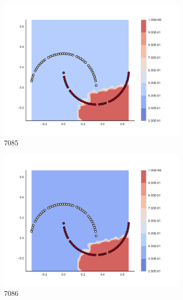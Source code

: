 \begin{figure}[h]
\begin{subfigure}[b]{0.09\textwidth}
    \includegraphics[clip, trim=2.35cm 1.75cm 4.5cm 0cm,width=\textwidth]{img/convergence/7085.pdf}
    \caption{7085}
    \label{fig:convergence_7085}
\end{subfigure}
%
\begin{subfigure}[b]{0.09\textwidth}
    \includegraphics[clip, trim=2.35cm 1.75cm 4.5cm 0cm,width=\textwidth]{img/convergence/7086.pdf}
    \caption{7086}
    \label{fig:convergence_7086}
\end{subfigure}
%
\begin{subfigure}[b]{0.09\textwidth}

\end{subfigure}
\end{figure}
